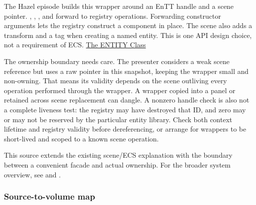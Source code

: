 The Hazel episode builds this wrapper around an EnTT handle and a scene pointer. , , , and  forward to registry operations. Forwarding constructor arguments lets the registry construct a component in place. The scene also adds a transform and a tag when creating a named entity. This is one API design choice, not a requirement of ECS. \href{https://www.youtube.com/watch?v=GfSzeAcsBb0}{The ENTITY Class}

The ownership boundary needs care. The presenter considers a weak scene reference but uses a raw pointer in this snapshot, keeping the wrapper small and non-owning. That means its validity depends on the scene outliving every operation performed through the wrapper. A wrapper copied into a panel or retained across scene replacement can dangle. A nonzero handle check is also not a complete liveness test: the registry may have destroyed that ID, and zero may or may not be reserved by the particular entity library. Check both context lifetime and registry validity before dereferencing, or arrange for wrappers to be short-lived and scoped to a known scene operation.

This source extends the existing scene/ECS explanation with the boundary between a convenient facade and actual ownership. For the broader system overview, see  and .

\subsubsection{Source-to-volume map}\label{06-engine-ii-ch031-source-to-volume-map-1}

